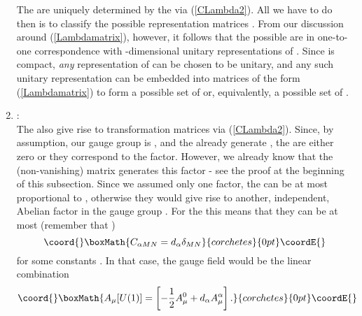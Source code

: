 \documentclass[a4paper,11pt]{article}
\begin{document}
\begin{enumerate}
The  \coordHE{} are uniquely determined by the \coordHE{}
via (\ref{CLambda2}). All we have to do then is  to classify the
possible \coordHE{} representation matrices \coordHE{}. From our
discussion around (\ref{Lambdamatrix}), however, it follows
that the possible \coordHE{} are in one-to-one
correspondence with \coordHE{}-dimensional unitary representations of
\coordHE{}. Since \coordHE{} is compact, \emph{any} representation
of \coordHE{} can be chosen to be unitary, and any such unitary
representation can be embedded into \coordHE{} matrices of
the form (\ref{Lambdamatrix}) to form a possible set of
\coordHE{} or, equivalently, a possible set of \coordHE{}.

\item  {}\coordHE{}:\\
The \coordHE{} also give rise to transformation matrices
\coordHE{} via (\ref{CLambda2}). Since, by
assumption, our gauge group is \coordHE{}, and the \coordHE{}
already generate \coordHE{}, the \coordHE{} are either
zero or they correspond to the \coordHE{} factor. However, we already know
that the (non-vanishing) matrix
\coordHE{} generates this \coordHE{} factor - see the proof at
the beginning of this subsection. Since we assumed only one
\coordHE{} factor, the \coordHE{} can be at most
proportional to \coordHE{}, otherwise they would give rise
to another, independent, Abelian factor in the gauge group \coordHE{}.
For the \coordHE{} this means that they can be at most
(remember that \coordHE{})
\begin{displaymath}\coord{}\boxMath{
    C_{\alpha MN}=d_{\alpha}\delta_{MN}
}{corchetes}{0pt}\coordE{}\end{displaymath}
for some constants \coordHE{}. In that case, the \coordHE{} gauge
field would be the linear combination
\begin{displaymath}\coord{}\boxMath{
A_{\mu}[U(1)]=\left[-\frac{1}{2}A_{\mu}^{0}+d_{\alpha}
        A_{\mu}^{\alpha}\right].
}{corchetes}{0pt}\coordE{}\end{displaymath}


\end{enumerate}
\end{document}
